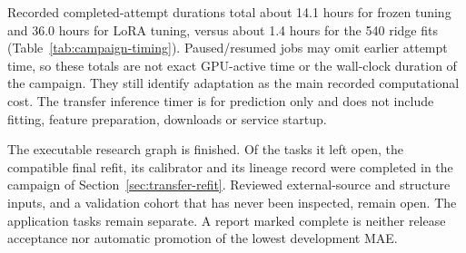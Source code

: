 Recorded completed-attempt durations total about 14.1 hours for frozen tuning and 36.0 hours for
LoRA tuning, versus about 1.4 hours for the 540 ridge fits (Table~\ref{tab:campaign-timing}).
Paused/resumed jobs may omit earlier attempt time, so these totals are not exact GPU-active time
or the wall-clock duration of the campaign. They still identify adaptation as the main recorded
computational cost. The transfer inference timer is for prediction only and does not include fitting,
feature preparation, downloads or service startup.

The executable research graph is finished. Of the tasks it left open, the compatible final refit,
its calibrator and its lineage record were completed in the campaign of
Section~\ref{sec:transfer-refit}. Reviewed external-source and structure inputs, and a validation
cohort that has never been inspected, remain open. The application tasks remain separate.
A report marked complete is neither release acceptance nor automatic promotion of the lowest
development MAE.

